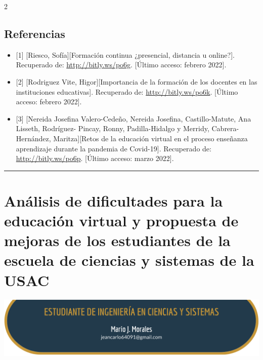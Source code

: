 \documentclass[12pt,spanish,Letterpaper,openany]{book}
\newcommand{\HRule}{\begin{center}\rule{0.5\linewidth}{0.2mm}\end{center}}
\begin{document}
\begin {multicols}{2}
\hypertarget{referencias-7}{%
\section*{Referencias}\label{referencias-7}}

\begin{itemize}
\item
  {[}1{]} {[}Riesco, Sofía{]}{[}Formación continua ¿presencial, distancia u online?{]}. Recuperado de: \url{http://bitly.ws/po6g}. {[}Último acceso: febrero 2022{]}.
\item
  {[}2{]} {[}Rodriguez Vite, Higor{]}{[}Importancia de la formación de los docentes en las instituciones educativas{]}. Recuperado de: \url{http://bitly.ws/po6k}. {[}Último acceso: febrero 2022{]}.
\item
  {[}3{]} {[}Nereida Josefina Valero-Cedeño, Nereida Josefina, Castillo-Matute, Ana Lisseth, Rodríguez-
  Pincay, Ronny, Padilla-Hidalgo y Merridy, Cabrera-
  Hernández, Maritza{]}{[}Retos de la educación virtual en el proceso enseñanza aprendizaje durante la pandemia de Covid-19{]}. Recuperado de: \url{http://bitly.ws/po6p}. {[}Último acceso: marzo 2022{]}.
\end{itemize}

\end {multicols}
\medskip
\HRule
\medskip

\hypertarget{mariomorales}{%
\chapter{Análisis de dificultades para la educación virtual y propuesta de mejoras de los estudiantes de la escuela de ciencias y sistemas de la USAC}\label{mariomorales}}

\begin{center}\includegraphics[width=1\linewidth]{images/mMorales_image1} \end{center}
\end{document}
